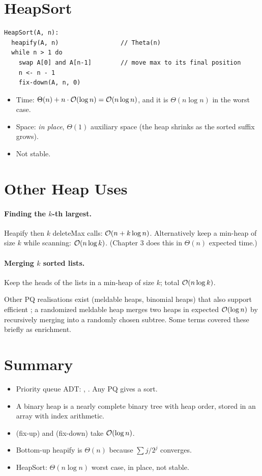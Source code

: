 \section{HeapSort}

\begin{lstlisting}
HeapSort(A, n):
  heapify(A, n)                 // Theta(n)
  while n > 1 do
    swap A[0] and A[n-1]        // move max to its final position
    n <- n - 1
    fix-down(A, n, 0)
\end{lstlisting}
\begin{itemize}
  \item Time: $\Theta(n) + n \cdot \mathcal{O}(\log n) = \mathcal{O}(n \log n)$, and it is
        $\Theta(n \log n)$ in the worst case.
  \item Space: \emph{in place}, $\Theta(1)$ auxiliary space (the heap shrinks as
        the sorted suffix grows).
  \item Not stable.
\end{itemize}

\section{Other Heap Uses}

\paragraph{Finding the $k$-th largest.} Heapify then $k$ deleteMax calls:
$\mathcal{O}(n + k \log n)$. Alternatively keep a min-heap of size $k$ while scanning:
$\mathcal{O}(n \log k)$. (Chapter 3 does this in $\Theta(n)$ expected time.)

\paragraph{Merging $k$ sorted lists.} Keep the heads of the lists in a min-heap
of size $k$; total $\mathcal{O}(n \log k)$.

\begin{aside}
Other PQ realisations exist (meldable heaps, binomial heaps) that also support
efficient ; a randomized meldable heap merges two heaps in expected
$\mathcal{O}(\log n)$ by recursively merging into a randomly chosen subtree. Some terms
covered these briefly as enrichment.
\end{aside}

\section{Summary}
\begin{itemize}
  \item Priority queue ADT: , . Any PQ gives a sort.
  \item A binary heap is a nearly complete binary tree with heap order, stored
        in an array with index arithmetic.
  \item {} (fix-up) and  (fix-down) take $\mathcal{O}(\log n)$.
  \item Bottom-up heapify is $\Theta(n)$ because $\sum j/2^j$ converges.
  \item HeapSort: $\Theta(n \log n)$ worst case, in place, not stable.
\end{itemize}
